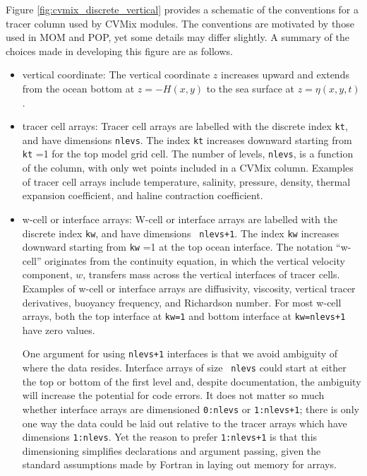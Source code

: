 Figure \ref{fig:cvmix_discrete_vertical} provides a schematic of the
conventions for a tracer column used by CVMix modules. The conventions
are motivated by those used in MOM and POP, yet some details may
differ slightly.  A summary of the choices made in developing this
figure are as follows.
\begin{itemize}

\item {\sc vertical coordinate}: The vertical coordinate $z$ increases
  upward and extends from the ocean bottom at $z=-H(x,y)$ to the sea
  surface at $z = \eta(x,y,t)$.

\item {\sc tracer cell arrays}: Tracer cell arrays are labelled with
  the discrete index {\tt kt}, and have dimensions {\tt nlevs}.  The
  index {\tt kt} increases downward starting from {\tt kt} =1 for the
  top model grid cell.  The number of levels, {\tt nlevs}, is a
  function of the column, with only wet points included in a CVMix
  column.  Examples of tracer cell arrays include temperature,
  salinity, pressure, density, thermal expansion coefficient, and
  haline contraction coefficient.

\item {\sc w-cell or interface arrays}: W-cell or interface arrays are
  labelled with the discrete index {\tt kw}, and have dimensions {\tt
    nlevs+1}.  The index {\tt kw} increases downward starting from
  {\tt kw} =1 at the top ocean interface.  The notation ``w-cell''
  originates from the continuity equation, in which the vertical
  velocity component, $w$, transfers mass across the vertical
  interfaces of tracer cells.  Examples of w-cell or interface arrays
  are diffusivity, viscosity, vertical tracer derivatives, buoyancy
  frequency, and Richardson number.  For most w-cell arrays, both the
  top interface at {\tt kw=1} and bottom interface at {\tt kw=nlevs+1}
  have zero values.

  One argument for using {\tt nlevs+1} interfaces is that we avoid
  ambiguity of where the data resides. Interface arrays of size {\tt
    nlevs} could start at either the top or bottom of the first level
  and, despite documentation, the ambiguity will increase the
  potential for code errors.  It does not matter so much whether
  interface arrays are dimensioned {\tt 0:nlevs} or {\tt 1:nlevs+1};
  there is only one way the data could be laid out relative to the
  tracer arrays which have dimensions {\tt 1:nlevs}. Yet the reason to
  prefer {\tt 1:nlevs+1} is that this dimensioning simplifies
  declarations and argument passing, given the standard assumptions
  made by Fortran in laying out memory for arrays.


\end{itemize}
